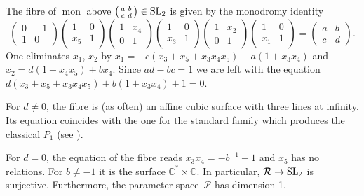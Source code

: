 \documentclass[10pt,a4paper]{amsart}
\numberwithin{equation}{section}
\begin{document}
 The fibre of $\operatorname{mon}$ above $\bigl(\begin{smallmatrix}a& b\\c& d\end{smallmatrix}\bigr)\in {\rm SL}_2$ is given by the
 monodromy identity
 \[ \begin{pmatrix}0& -1\\1&0 \end{pmatrix}\begin{pmatrix} 1& 0\\x_5& 1 \end{pmatrix}\begin{pmatrix}1& x_4\\0& 1\end{pmatrix}\begin{pmatrix}1& 0\\x_3& 1 \end{pmatrix}
\begin{pmatrix}1& x_2\\0& 1 \end{pmatrix}\begin{pmatrix}1& 0\\x_1& 1\end{pmatrix}= \begin{pmatrix}a& b\\c& d \end{pmatrix}. \]
One eliminates $x_1$, $x_2$ by $x_1=-c(x_3+x_5+x_3x_4x_5)-a(1+x_3x_4)$ and $x_2=d(1+x_4x_5)+bx_4$.
Since $ad-bc=1$ we are left with the equation $ d(x_3+x_5+x_3x_4x_5)+b(1+x_3x_4)+1=0$.

For $d\neq 0$, the fibre is (as often) an affine cubic surface with three lines at infinity. Its equation coincides with the one for the
standard family which produces the classical $P_1$ (see \cite[Section~3.10]{vdP-Sa}).

For $d=0$, the equation of the fibre reads $x_3x_4=-b^{-1}-1$ and $x_5$ has no relations.
For $b\neq -1$ it is the surface $\mathbb{C}^*\times \mathbb{C}$. In particular, $\mathcal{R}\rightarrow {\rm SL}_2$ is surjective. Furthermore, the parameter space~$\mathcal{P}$ has dimension 1.
\end{document}
